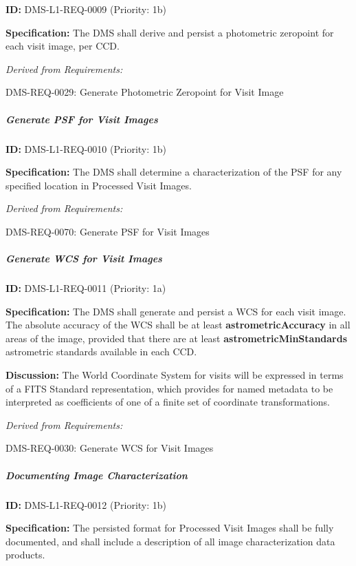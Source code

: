 \documentclass[SE,toc,lsstdraft]{lsstdoc}
\begin{document}
\label{DMS-L1-REQ-0009}
\textbf{ID:} DMS-L1-REQ-0009 (Priority: 1b)

\textbf{Specification:} The DMS shall derive and persist a photometric zeropoint for each visit image, per CCD.

\emph{Derived from Requirements:}

DMS-REQ-0029:
Generate Photometric Zeropoint for Visit Image \newline

\subparagraph{Generate PSF for Visit Images}\hfill  %

\label{DMS-L1-REQ-0010}
\textbf{ID:} DMS-L1-REQ-0010 (Priority: 1b)

\textbf{Specification:} The DMS shall determine a characterization of the PSF for any specified location in Processed Visit Images.

\emph{Derived from Requirements:}

DMS-REQ-0070:
Generate PSF for Visit Images \newline

\subparagraph{Generate WCS for Visit Images}\hfill  %

\label{DMS-L1-REQ-0011}
\textbf{ID:} DMS-L1-REQ-0011 (Priority: 1a)

\textbf{Specification:} The DMS shall generate and persist a WCS for each visit image.  The absolute accuracy of the WCS shall be at least \textbf{astrometricAccuracy} in all areas of the image, provided that there are at least \textbf{astrometricMinStandards} astrometric standards available in each CCD.

\textbf{Discussion:} The World Coordinate System for visits will be expressed in terms of a FITS Standard representation, which provides for named metadata to be interpreted as coefficients of one of a finite set of coordinate transformations.

\emph{Derived from Requirements:}

DMS-REQ-0030:
Generate WCS for Visit Images \newline

\subparagraph{Documenting Image Characterization}\hfill  %

\label{DMS-L1-REQ-0012}
\textbf{ID:} DMS-L1-REQ-0012 (Priority: 1b)

\textbf{Specification:} The persisted format for Processed Visit Images shall be fully documented, and shall include a description of all image characterization data products.
\end{document}
